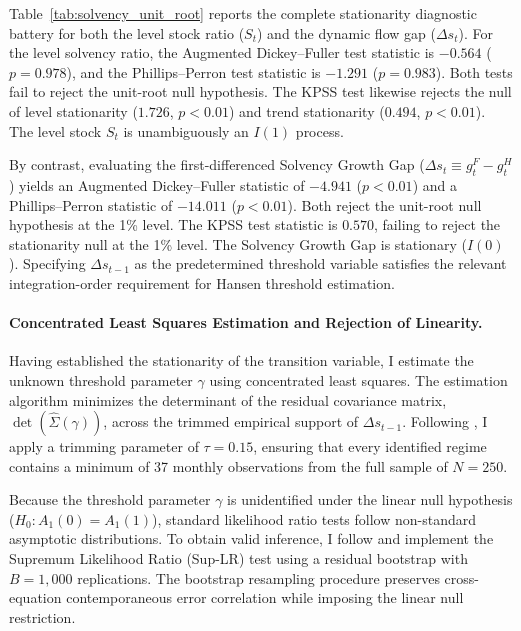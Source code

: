 Table~\ref{tab:solvency_unit_root} reports the complete stationarity diagnostic battery for both the level stock ratio ($S_t$) and the dynamic flow gap ($\Delta s_t$). For the level solvency ratio, the Augmented Dickey--Fuller test statistic is $-0.564$ ($p = 0.978$), and the Phillips--Perron test statistic is $-1.291$ ($p = 0.983$). Both tests fail to reject the unit-root null hypothesis. The KPSS test likewise rejects the null of level stationarity ($1.726$, $p < 0.01$) and trend stationarity ($0.494$, $p < 0.01$). The level stock $S_t$ is unambiguously an $I(1)$ process.



By contrast, evaluating the first-differenced Solvency Growth Gap ($\Delta s_t \equiv g^F_t - g^H_t$) yields an Augmented Dickey--Fuller statistic of $-4.941$ ($p < 0.01$) and a Phillips--Perron statistic of $-14.011$ ($p < 0.01$). Both reject the unit-root null hypothesis at the 1\% level. The KPSS test statistic is $0.570$, failing to reject the stationarity null at the 1\% level. The Solvency Growth Gap is stationary ($I(0)$). Specifying $\Delta s_{t-1}$ as the predetermined threshold variable satisfies the relevant integration-order requirement for Hansen threshold estimation.

\paragraph{Concentrated Least Squares Estimation and Rejection of Linearity.}
Having established the stationarity of the transition variable, I estimate the unknown threshold parameter $\gamma$ using concentrated least squares. The estimation algorithm minimizes the determinant of the residual covariance matrix, $\det(\hat{\Sigma}(\gamma))$, across the trimmed empirical support of $\Delta s_{t-1}$. Following \citet{Hansen1999}, I apply a trimming parameter of $\tau = 0.15$, ensuring that every identified regime contains a minimum of 37 monthly observations from the full sample of $N=250$.

Because the threshold parameter $\gamma$ is unidentified under the linear null hypothesis ($H_0: A_1(0) = A_1(1)$), standard likelihood ratio tests follow non-standard asymptotic distributions. To obtain valid inference, I follow \citet{Hansen1999} and implement the Supremum Likelihood Ratio (Sup-LR) test using a residual bootstrap with $B = 1{,}000$ replications. The bootstrap resampling procedure preserves cross-equation contemporaneous error correlation while imposing the linear null restriction.


